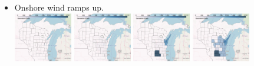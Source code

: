 \documentclass[xcolor=dvipsnames]{beamer}
\begin{document}
\begin{frame}
\begin{itemize}
\item Onshore wind ramps up. \\
  \includegraphics[width=0.2\textwidth]{includes/no_leakage_no_shutdowns_wind_r0.png}
  \includegraphics[width=0.2\textwidth]{includes/no_leakage_no_shutdowns_wind_r2.png}
  \includegraphics[width=0.2\textwidth]{includes/no_leakage_no_shutdowns_wind_r3.png}
  \includegraphics[width=0.2\textwidth]{includes/no_leakage_no_shutdowns_wind_r4.png}
\end{itemize}
\end{frame}
\end{document}
